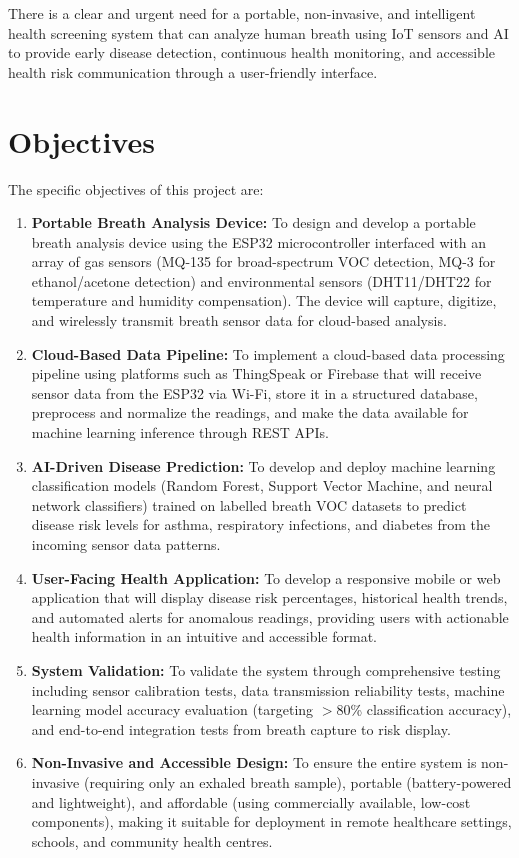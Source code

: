There is a clear and urgent need for a portable, non-invasive, and intelligent health screening system that can analyze human breath using IoT sensors and AI to provide early disease detection, continuous health monitoring, and accessible health risk communication through a user-friendly interface.

\section{Objectives}
The specific objectives of this project are:

\begin{enumerate}[leftmargin=1.5cm]
\item \textbf{Portable Breath Analysis Device:} To design and develop a portable breath analysis device using the ESP32 microcontroller interfaced with an array of gas sensors (MQ-135 for broad-spectrum VOC detection, MQ-3 for ethanol/acetone detection) and environmental sensors (DHT11/DHT22 for temperature and humidity compensation). The device will capture, digitize, and wirelessly transmit breath sensor data for cloud-based analysis.

\item \textbf{Cloud-Based Data Pipeline:} To implement a cloud-based data processing pipeline using platforms such as ThingSpeak or Firebase that will receive sensor data from the ESP32 via Wi-Fi, store it in a structured database, preprocess and normalize the readings, and make the data available for machine learning inference through REST APIs.

\item \textbf{AI-Driven Disease Prediction:} To develop and deploy machine learning classification models (Random Forest, Support Vector Machine, and neural network classifiers) trained on labelled breath VOC datasets to predict disease risk levels for asthma, respiratory infections, and diabetes from the incoming sensor data patterns.

\item \textbf{User-Facing Health Application:} To develop a responsive mobile or web application that will display disease risk percentages, historical health trends, and automated alerts for anomalous readings, providing users with actionable health information in an intuitive and accessible format.

\item \textbf{System Validation:} To validate the system through comprehensive testing including sensor calibration tests, data transmission reliability tests, machine learning model accuracy evaluation (targeting $>$80\% classification accuracy), and end-to-end integration tests from breath capture to risk display.

\item \textbf{Non-Invasive and Accessible Design:} To ensure the entire system is non-invasive (requiring only an exhaled breath sample), portable (battery-powered and lightweight), and affordable (using commercially available, low-cost components), making it suitable for deployment in remote healthcare settings, schools, and community health centres.
\end{enumerate}
